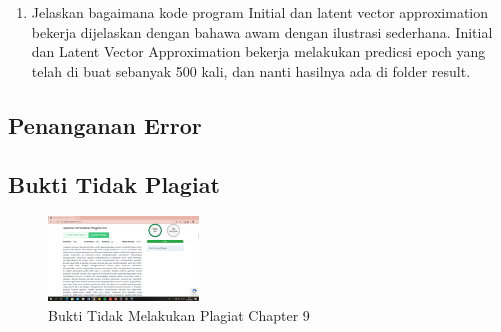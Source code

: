 \begin{enumerate}
		

        	\item Jelaskan bagaimana kode program Initial dan latent vector approximation bekerja dijelaskan dengan bahawa awam dengan ilustrasi sederhana.
Initial dan Latent Vector Approximation bekerja melakukan predicsi epoch yang telah di buat sebanyak 500 kali, dan nanti hasilnya ada di folder result.

		


\end{enumerate}

\subsection{Penanganan Error}

\subsection{Bukti Tidak Plagiat}
\begin{figure}[H]
\centering
	\includegraphics[width=4cm]{figures/1174069/9/bukti/bukti.PNG}
	\caption{Bukti Tidak Melakukan Plagiat Chapter 9}
\end{figure}
